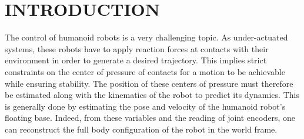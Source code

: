 \documentclass{IJCAS}
\begin{document}




\section{INTRODUCTION}




The control of humanoid robots is a very challenging topic. As under-actuated systems, these robots have to apply reaction forces at contacts with their environment in order to generate a desired trajectory. This implies strict constraints on the center of pressure of contacts for a motion to be achievable while ensuring stability. The position of these centers of pressure must therefore be estimated along with the kinematics of the robot to predict its dynamics. This is generally done by estimating the pose and velocity of the humanoid robot's floating base. Indeed, from these variables and the reading of joint encoders, one can reconstruct the full body configuration of the robot in the world frame.
\end{document}
